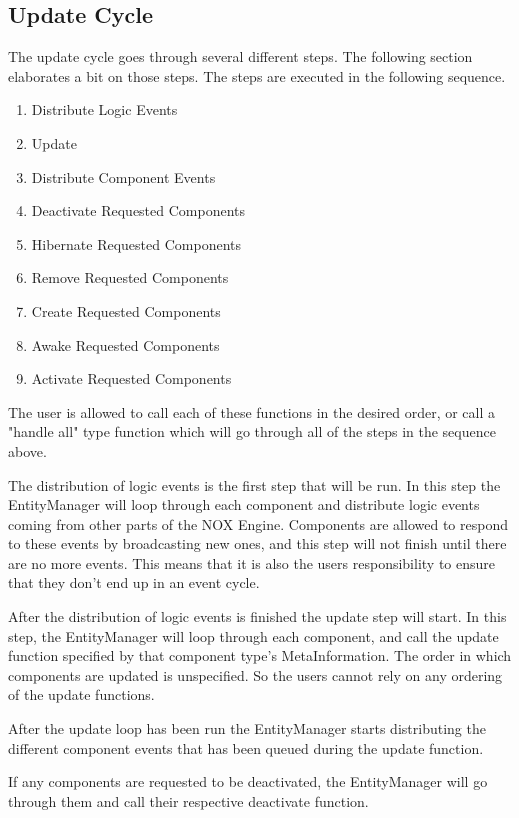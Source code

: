 \subsection{Update Cycle}
The update cycle goes through several different steps. The following section elaborates a bit on those steps. The steps are executed in the following sequence.
\begin{enumerate}
    \item Distribute Logic Events
    \item Update
    \item Distribute Component Events
    \item Deactivate Requested Components
    \item Hibernate Requested Components
    \item Remove Requested Components
    \item Create Requested Components
    \item Awake Requested Components
    \item Activate Requested Components
\end{enumerate}

The user is allowed to call each of these functions in the desired order, 
or call a "handle all" type function which will go through all of the steps in the sequence above.

The distribution of logic events is the first step that will be run.
In this step the EntityManager will loop through each component and distribute logic events coming from other parts of the NOX Engine. 
Components are allowed to respond to these events by broadcasting new ones, 
and this step will not finish until there are no more events.
This means that it is also the users responsibility to ensure that they don't
end up in an event cycle.

After the distribution of logic events is finished the update step will start. In this step, the EntityManager will loop through each component,
and call the update function specified by that component type's MetaInformation.
The order in which components are updated is unspecified. So the users cannot rely on any ordering of the update functions.

After the update loop has been run the EntityManager starts distributing the different component events that has been queued during the update function.

If any components are requested to be deactivated, the EntityManager will go through them and call their respective deactivate function.

